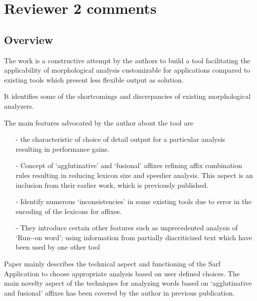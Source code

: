 \section*{Reviewer 2 comments}

\subsection*{Overview}
The work is a constructive attempt by the authors to build a tool facilitating the applicability of morphological analysis customizable for applications compared to existing tools which present  less flexible output as solution. 

It identifies some of the shortcomings and discrepancies of existing morphological analyzers. 

The main features advocated by the author about the tool are 
\begin{itemize}
\item[-] the characteristic of choice of detail output for a particular analysis resulting in performance gains. 
\item [-] Concept of  ‘agglutinative’ and ‘fusional’ affixes refining affix combination rules resulting in  reducing lexicon size and speedier analysis.
This aspect is an inclusion from their earlier work, which is previously published.
\item[-] Identify numerous `inconsistencies’ in some existing tools due to error in the encoding of the lexicons for affixes.
\item[-] They introduce certain  other features such as unprecedented analysis of  `Run-­‐on word’; using information from partially diacriticized text which have been used by one other tool
\end{itemize}
Paper mainly describes the technical aspect and functioning of the Sarf Application to choose appropriate analysis based on user defined choices.  The main novelty  aspect of the techniques for analyzing words based on `agglutinative and fusional’ affixes has been covered by the author in previous publication.

